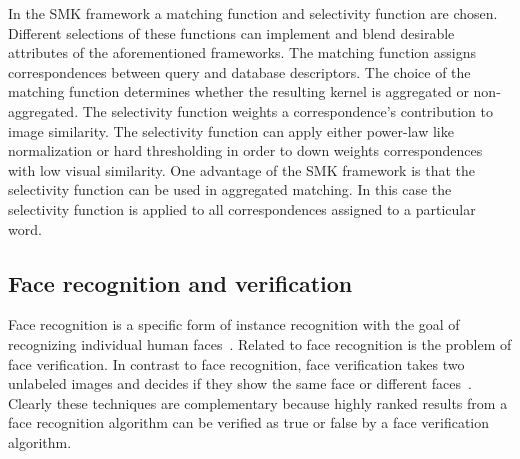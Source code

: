         In the SMK framework a matching function and selectivity
          function are chosen.
        Different selections of these functions can implement and blend
          desirable attributes of the aforementioned frameworks.
        The matching function assigns correspondences between query and
          database descriptors.
        The choice of the matching function determines whether the
          resulting kernel is aggregated or non-aggregated.
        The selectivity function weights a correspondence's
          contribution to image similarity.
        The selectivity function can apply either power-law like
          normalization or hard thresholding in order to down weights
          correspondences with low visual similarity.
        One advantage of the SMK framework is that the selectivity
          function can be used in aggregated matching.
        In this case the selectivity function is applied to all
          correspondences assigned to a particular word.



    \subsection{Face recognition and verification}
        Face recognition is a specific form of instance recognition
          with the goal of recognizing individual human
          faces~\cite{zhao_face_2003, huang_labeled_2007}.
        Related to face recognition is the problem of face
          verification.
        In contrast to face recognition, face verification takes two
          unlabeled images and decides if they show the same face or
          different faces~\cite{taigman_deepface_2014}.
        Clearly these techniques are complementary because highly
          ranked results from a face recognition algorithm can be
          verified as true or false by a face verification algorithm.

